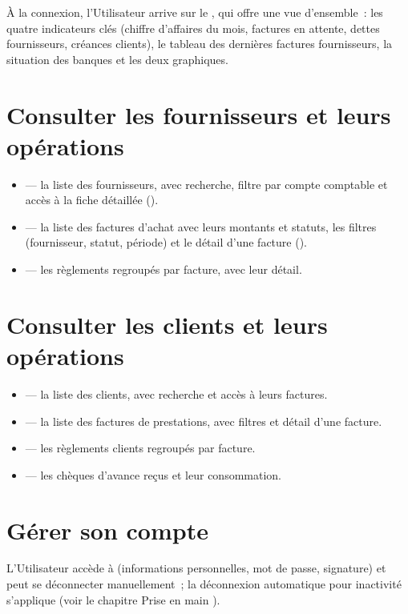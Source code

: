 À la connexion, l'Utilisateur arrive sur le , qui offre une vue d'ensemble~: les quatre indicateurs clés (chiffre d'affaires du mois, factures en attente, dettes fournisseurs, créances clients), le tableau des dernières factures fournisseurs, la situation des banques et les deux graphiques.


\section{Consulter les fournisseurs et leurs opérations}

\begin{itemize}
  \item {} — la liste des fournisseurs, avec recherche, filtre par compte comptable et accès à la fiche détaillée ().
  \item {} — la liste des factures d'achat avec leurs montants et statuts, les filtres (fournisseur, statut, période) et le détail d'une facture ().
  \item {} — les règlements regroupés par facture, avec leur détail.
\end{itemize}


\section{Consulter les clients et leurs opérations}

\begin{itemize}
  \item {} — la liste des clients, avec recherche et accès à leurs factures.
  \item {} — la liste des factures de prestations, avec filtres et détail d'une facture.
  \item {} — les règlements clients regroupés par facture.
  \item {} — les chèques d'avance reçus et leur consommation.
\end{itemize}


\section{Gérer son compte}

L'Utilisateur accède à  (informations personnelles, mot de passe, signature) et peut se déconnecter manuellement~; la déconnexion automatique pour inactivité s'applique (voir le chapitre \og Prise en main \fg{}).

